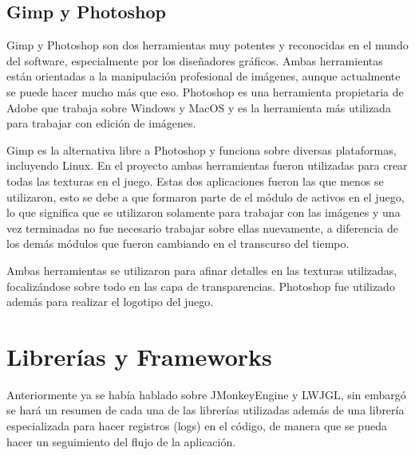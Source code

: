 \documentclass[a4paper,12pt,openany,oneside]{book}
\begin{document}
\subsection{Gimp y Photoshop}
Gimp y Photoshop son dos herramientas muy potentes y reconocidas en el mundo del software, especialmente por los diseñadores gráficos. Ambas herramientas están orientadas a la manipulación profesional de imágenes, aunque actualmente se puede hacer mucho más que eso. Photoshop es una herramienta propietaria de Adobe que trabaja sobre Windows y MacOS y es la herramienta más utilizada para trabajar con edición de imágenes.

Gimp es la alternativa libre a Photoshop y funciona sobre diversas plataformas, incluyendo Linux. En el proyecto ambas herramientas fueron utilizadas para crear todas las texturas en el juego. Estas dos aplicaciones fueron las que menos se utilizaron, esto se debe a que formaron parte de el módulo de activos en el juego, lo que significa que se utilizaron solamente para trabajar con las imágenes y una vez terminadas no fue necesario trabajar sobre ellas nuevamente, a diferencia de los demás módulos que fueron cambiando en el transcurso del tiempo.

Ambas herramientas se utilizaron para afinar detalles en las texturas utilizadas, focalizándose sobre todo en las capa de transparencias.
Photoshop fue utilizado además para realizar el logotipo del juego.
\section{Librerías y Frameworks}
Anteriormente ya se había hablado sobre JMonkeyEngine y LWJGL, sin embargó se hará un resumen de cada una de las librerías utilizadas además de una librería especializada para hacer registros (logs) en el código, de manera que se pueda hacer un seguimiento del flujo de la aplicación.
\end{document}
